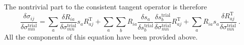 \documentclass[]{scrreprt}
\begin{document}
The nontrivial part to the consistent tangent operator is therefore
\begin{equation}
  \frac{\delta \sigma_{ij}}{\delta\sigma_{mn}^{\mathrm{trial}}} =
\sum_{a}  \frac{\delta
    R_{ia}}{\delta\sigma_{mn}^{\mathrm{trial}}}s_{a}R_{aj}^{\mathrm{T}}
  + \sum_{a}\sum_{b} R_{ia}\frac{\delta s_{a}}{\delta s_{b}^{\mathrm{trial}}}
  \frac{\delta s_{b}^{\mathrm{trial}}}{\delta
    \sigma_{mn}^{\mathrm{trial}}}R_{aj}^{\mathrm{T}} +
  \sum_{a} R_{ia}s_{a}\frac{\delta
    R_{aj}^{\mathrm{T}}}{\delta\sigma_{mn}^{\mathrm{trial}}} \ .
\end{equation}
All the components of this equation have been provided above.
\end{document}
